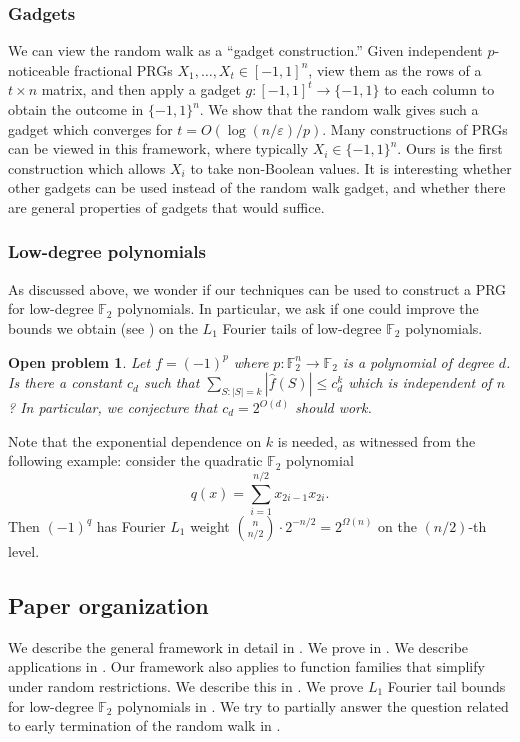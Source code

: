\documentclass{toc}
\newcommand{\F}{\mathbb{F}}
\newcommand{\eps}{\varepsilon}
\newtheorem{open}[theorem]{Open problem}
\begin{document}
\subsubsection{Gadgets}
We can view the random walk as a ``gadget construction.'' Given independent $p$-noticeable fractional PRGs
$X_1,\ldots,X_t \in [-1,1]^n$, view them as the rows of a $t \times n$ matrix, and then apply a gadget $g:[-1,1]^t \to \{-1,1\}$
to each column to obtain the outcome in $\{-1,1\}^n$. We show that the random walk gives such a gadget which converges for $t=O(\log(n/\eps)/p)$.
Many constructions of PRGs can be viewed in this framework, where typically $X_i \in \{-1,1\}^n$. Ours is the first construction which allows
$X_i$ to take non-Boolean values. It is interesting whether other gadgets can be used instead of the random walk gadget, and whether there are
general properties of gadgets that would suffice.

\subsubsection{Low-degree polynomials}
As discussed above, we wonder if our techniques can be used to construct a PRG for low-degree $\F_2$ polynomials. In particular, we ask if one could improve the bounds we obtain (see ) on the $L_1$ Fourier tails of low-degree $\F_2$ polynomials.

\begin{open}
 Let $f=(-1)^p$ where $p:\F_2^n \to \F_2$ is a polynomial of degree $d$. Is there a constant $c_d$ such that  $\sum_{S : |S|=k} |\hat{f}(S)| \le c_d^{k}$
which is independent of $n$? In particular, we conjecture
that $c_d=2^{O(d)}$ should work.
\end{open}
Note that the exponential dependence on $k$ is needed,
as witnessed from the following example: consider the quadratic $\F_2$ polynomial
\[
  q(x)=\sum_{i=1}^{n/2}x_{2i-1}x_{2i}.
\]
Then $(-1)^{q}$ has Fourier $L_1$ weight
$\binom{n}{n/2} \cdot 2^{-n/2} = 2^{\Omega(n)}$ on the $(n/2)$-th
level.

%
%
%
%
%
%
%

%
%
%
%
%

%
%


\subsection{Paper organization}
We describe the general framework in detail in . We prove  in . We describe
applications in . Our framework also applies to function families that simplify under random restrictions. We describe this in . We prove $L_1$ Fourier tail bounds for low-degree $\F_2$ polynomials in . We try to partially answer the question related to early termination of the random walk in .
\end{document}
